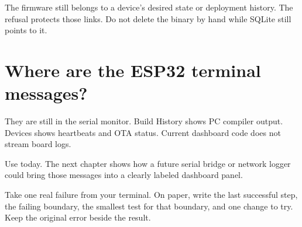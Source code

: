 The firmware still belongs to a device's desired state or deployment history. The refusal protects those links. Do not delete the binary by hand while SQLite still points to it.

\section{Where are the ESP32 terminal messages?}

They are still in the serial monitor. Build History shows PC compiler output. Devices shows heartbeats and OTA status. Current dashboard code does not stream board logs.

Use  today. The next chapter shows how a future serial bridge or network logger could bring those messages into a clearly labeled dashboard panel.

\begin{checkpoint}
Take one real failure from your terminal. On paper, write the last successful step, the failing boundary, the smallest test for that boundary, and one change to try. Keep the original error beside the result.
\end{checkpoint}

